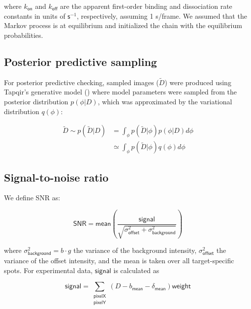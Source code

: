 \noindent
where $k_{\mathsf{on}}$ and $k_{\mathsf{off}}$ are the apparent first-order binding and dissociation rate constants in units of $\mathsf{s}^{-1}$, respectively, assuming 1 s/frame. We assumed that the Markov process is at equilibrium and initialized the chain with the equilibrium probabilities.

\subsection{Posterior predictive sampling}

For posterior predictive checking, sampled images ($\widetilde{D}$) were produced using Tapqir's generative model () where model parameters were sampled from the posterior distribution $p(\phi|D)$, which was approximated by the variational distribution $q(\phi)$:

\begin{equation}
\begin{aligned}
    \widetilde{D} \sim p(\widetilde{D} | D) &= \int_\phi p(\widetilde{D} | \phi) p(\phi | D) d\phi \\
    &\simeq \int_\phi p(\widetilde{D} | \phi) q(\phi) d\phi
\end{aligned}
\end{equation}

\subsection{Signal-to-noise ratio}

We define SNR as:

\begin{equation}
    \mathsf{SNR} = \mathsf{mean} \left( \dfrac{\mathsf{signal}}{\sqrt{\sigma^2_{\mathsf{offset}} + \sigma^2_{\mathsf{background}}}} \right)
\end{equation}

where $\sigma^2_{\mathsf{background}} = b \cdot g$ the variance of the background intensity, $\sigma^2_{\mathsf{offset}}$ the variance of the offset intensity, and the mean is taken over all target-specific spots.  For experimental data, $\mathsf{signal}$ is calculated as

\begin{equation}
    \mathsf{signal} =  \sum_{\substack{\mathsf{pixelX} \\ \mathsf{pixelY}}} \left( D - b_{\mathsf{mean}} - \delta_\mathsf{mean} \right)  \mathsf{weight}
\end{equation}

